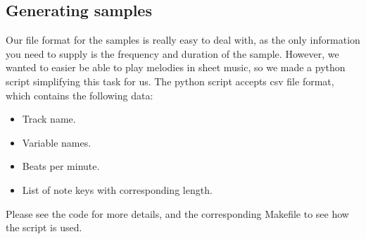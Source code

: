 \subsection{Generating samples}
Our file format for the samples is really easy to deal with, as the only information you need to supply is the frequency and duration of the sample. However, we wanted to easier be able to play melodies in sheet music, so we made a python script simplifying this task for us. The python script accepts csv file format, which contains the following data:
\begin{itemize}
	\item Track name.
	\item Variable names.
	\item Beats per minute.
	\item List of note keys with corresponding length.
\end{itemize}

Please see the code for more details, and the corresponding Makefile to see how the script is used.

